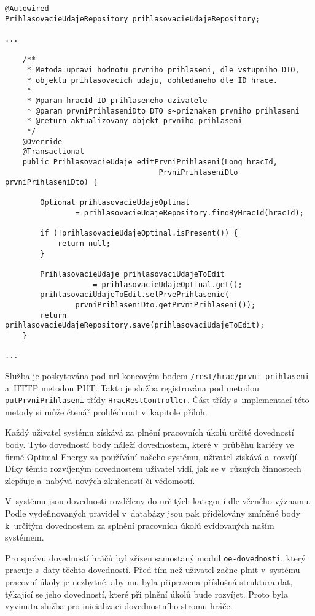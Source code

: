 \documentclass[12pt]{article}
\begin{document}
{\begin{lstlisting}
@Autowired
PrihlasovacieUdajeRepository prihlasovacieUdajeRepository;

...

    /**
     * Metoda upravi hodnotu prvniho prihlaseni, dle vstupniho DTO,
     * objektu prihlasovacich udaju, dohledaneho dle ID hrace.
     * 
     * @param hracId ID prihlaseneho uzivatele
     * @param prvniPrihlaseniDto DTO s~priznakem prvniho prihlaseni
     * @return aktualizovany objekt prvniho prihlaseni
     */
    @Override
    @Transactional
    public PrihlasovacieUdaje editPrvniPrihlaseni(Long hracId,
                                   PrvniPrihlaseniDto prvniPrihlaseniDto) {

        Optional prihlasovacieUdajeOptinal
                = prihlasovacieUdajeRepository.findByHracId(hracId);

        if (!prihlasovacieUdajeOptinal.isPresent()) {
            return null;
        }

        PrihlasovacieUdaje prihlasovaciUdajeToEdit 
                    = prihlasovacieUdajeOptinal.get();
        prihlasovaciUdajeToEdit.setPrvePrihlasenie(
                prvniPrihlaseniDto.getPrvniPrihlaseni());
        return prihlasovacieUdajeRepository.save(prihlasovaciUdajeToEdit);
    }

...
\end{lstlisting}

Služba je poskytována pod url koncovým bodem \texttt{/rest/hrac/prvni-prihlaseni} a~HTTP metodou PUT.
Takto je služba registrována pod metodou \texttt{putPrvniPrihlaseni} třídy \texttt{HracRestController}.
Část třídy s~implementací této metody si může čtenář prohlédnout v~kapitole příloh.

\clearpage


Každý uživatel systému získává za plnění pracovních úkolů určité dovedností body.
Tyto dovedností body náleží dovednostem, které v~průběhu kariéry ve firmě Optimal Energy za používání našeho systému,
uživatel získává a~rozvíjí.
Díky těmto rozvíjeným dovednostem uživatel vidí,
jak se v~různých činnostech zlepšuje a~nabývá nových zkušeností či vědomostí.

V~systému jsou dovednosti rozděleny do určitých kategorií dle věcného významu.
Podle vydefinovaných pravidel v~databázy jsou pak přidělovány zmíněné body k~určitým dovednostem za splnění pracovních úkolů evidovaných naším systémem.

Pro správu dovedností hráčů byl zřízen samostaný modul \texttt{oe-dovednosti},
který pracuje s~daty těchto dovedností.
Před tím než uživatel začne plnit v~systému pracovní úkoly je nezbytné,
aby mu byla připravena příslušná struktura dat, týkající se jeho dovedností,
které při plnění úkolů bude rozvíjet.
Proto byla vyvinuta služba pro inicializaci dovednostního stromu hráče.

}
\end{document}
